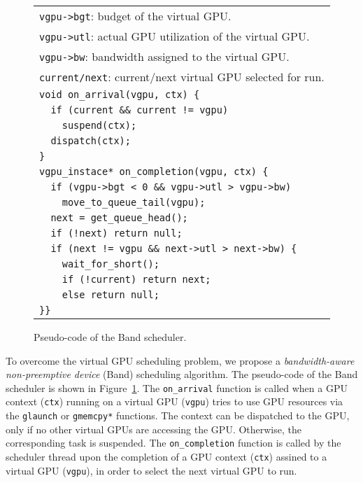 \begin{figure}[t]
 \begin{center}
  \begin{tabular}{l}
   \hline
   \hline
   {\small \verb|vgpu->bgt|: budget of the virtual GPU.}\\
   {\small \verb|vgpu->utl|: actual GPU utilization of the virtual GPU.}\\
   {\small \verb|vgpu->bw|: bandwidth assigned to the virtual
   GPU.}\\
   {\small \verb|current/next|: current/next virtual GPU selected for run.}\\
   \hline
   {\small \verb|void on_arrival(vgpu, ctx) {|}\\
   {\small \verb|  if (current && current != vgpu)|}\\
   {\small \verb|    suspend(ctx);|}\\
   {\small \verb|  dispatch(ctx);|}\\
   {\small \verb|}|}\\
   {\small \verb|vgpu_instace* on_completion(vgpu, ctx) {|}\\
   {\small \verb|  if (vgpu->bgt < 0 && vgpu->utl > vgpu->bw)|}\\
   {\small \verb|    move_to_queue_tail(vgpu);|}\\
   {\small \verb|  next = get_queue_head();|}\\
   {\small \verb|  if (!next) return null;|}\\
   {\small \verb|  if (next != vgpu && next->utl > next->bw) {|}\\
   {\small \verb|    wait_for_short();|}\\
   {\small \verb|    if (!current) return next;|}\\
   {\small \verb|    else return null;|}\\
   {\small \verb|}}|}\\
   \hline
  \end{tabular}
  \caption{Pseudo-code of the Band scheduler.}
  \label{fig:band}
 \end{center}
 \vspace{-1.5em}
\end{figure}

To overcome the virtual GPU scheduling problem, we propose a
\textit{bandwidth-aware non-preemptive device} (Band) scheduling
algorithm.
The pseudo-code of the Band scheduler is shown in
Figure~\ref{fig:band}.
The \texttt{on\_arrival} function is called when a GPU context
(\texttt{ctx}) running on a virtual GPU (\texttt{vgpu}) tries to use GPU
resources via the \texttt{glaunch} or \texttt{gmemcpy*} functions.
The context can be dispatched to the GPU, only if no other virtual GPUs
are accessing the GPU.
Otherwise, the corresponding task is suspended.
The \texttt{on\_completion} function is called by the scheduler thread
upon the completion of a GPU context (\texttt{ctx}) assined to a virtual
GPU (\texttt{vgpu}), in order to select the next virtual GPU to run.

